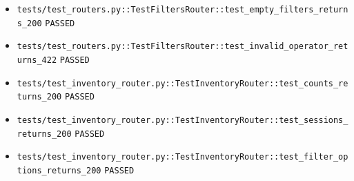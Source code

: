 \documentclass[12pt, titlepage]{article}
\begin{document}
{\begin{itemize}[leftmargin=1.5em, itemsep=0.2em, topsep=0.3em]
  \item \nolinkurl{tests/test_routers.py::TestFiltersRouter::test_empty_filters_returns_200} \texttt{PASSED}
  \item \nolinkurl{tests/test_routers.py::TestFiltersRouter::test_invalid_operator_returns_422} \texttt{PASSED}
  \item \nolinkurl{tests/test_inventory_router.py::TestInventoryRouter::test_counts_returns_200} \texttt{PASSED}
  \item \nolinkurl{tests/test_inventory_router.py::TestInventoryRouter::test_sessions_returns_200} \texttt{PASSED}
  \item \nolinkurl{tests/test_inventory_router.py::TestInventoryRouter::test_filter_options_returns_200} \texttt{PASSED}
\end{itemize}
}
\end{document}
